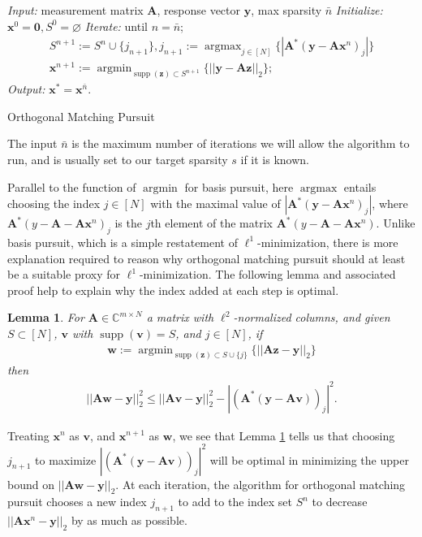 \documentclass[12pt,a4paper]{amsart}
\numberwithin{equation}{section}
\theoremstyle{plain}
\newtheorem{Lemma}[Th]{Lemma}
\theoremstyle{definition}
\newcommand{\BC}{\mathbb C}
\newcommand{\bdy}{\mathbf{y}}
\newcommand{\bdx}{\mathbf{x}}
\newcommand{\bdz}{\mathbf{z}}
\newcommand{\bdv}{\mathbf{v}}
\newcommand{\bdw}{\mathbf{w}}
\newcommand{\bdA}{\mathbf{A}}
\DeclareMathOperator{\argmin}{argmin}
\DeclareMathOperator{\argmax}{argmax}
\DeclareMathOperator{\supp}{supp}
\begin{document}
\begin{algorithm}
 \textit{Input:} measurement matrix $\bdA$, response vector $\bdy$, max sparsity $\bar n$\;
 \textit{Initialize:} $\bdx^0=\mathbf{0},S^0=\varnothing$\;
 \textit{Iterate:} until $n=\bar n$;
 \begin{align*}
     S^{n+1}:=S^n\cup\{j_{n+1}\}, j_{n+1}:=\argmax_{j\in[N]}\{|\bdA^*(\bdy-\bdA\bdx^n)_j|\}\\
     \bdx^{n+1}:=\argmin_{\supp(\bdz)\subset S^{n+1}}\{||\bdy-\bdA\bdz||_2\};
 \end{align*}
\textit{Output:} $\bdx^*=\bdx^{\bar n}$.
 \caption{Orthogonal Matching Pursuit}
\end{algorithm}

The input $\bar n$ is the maximum number of iterations we will allow the algorithm to run, and is usually set to our target sparsity $s$ if it is known.

Parallel to the function of $\argmin$ for basis pursuit, here $\argmax$ entails choosing the index $j\in[N]$ with the maximal value of $|\bdA^*(\bdy-\bdA\bdx^n)_j|$, where $\bdA^*(y-\bdA-\bdA\bdx^n)_j$ is the $j$th element of the matrix $\bdA^*(y-\bdA-\bdA\bdx^n)$. Unlike basis pursuit, which is a simple restatement of $\ell^1$-minimization, there is more explanation required to reason why orthogonal matching pursuit should at least be a suitable proxy for $\ell^1$-minimization. The following lemma and associated proof help to explain why the index added at each step is optimal.

\begin{Lemma}\label{omp-lem} For $\bdA\in\BC^{m\times N}$ a matrix with $\ell^2$-normalized columns, and given $S\subset[N]$, $\bdv$ with $\supp(\bdv)=S$, and $j\in [N]$, if
\begin{align}\label{omp-min}
    \bdw := \argmin_{\supp(\bdz)\subset S\cup\{j\}}\{||\bdA\bdz-\bdy||_2\}
\end{align}
then
\begin{align}
    ||\bdA\bdw-\bdy||^2_2\leq||\bdA\bdv-\bdy||^2_2-|(\bdA^*(\bdy-\bdA\bdv))_j|^2.
\end{align}
\end{Lemma}

Treating $\bdx^n$ as $\bdv$, and $\bdx^{n+1}$ as $\bdw$, we see that Lemma \ref{omp-lem} tells us that choosing $j_{n+1}$ to maximize $|(\bdA^*(\bdy-\bdA\bdv))_j|^2$ will be optimal in minimizing the upper bound on $||\bdA\bdw-\bdy||_2$. At each iteration, the algorithm for orthogonal matching pursuit chooses a new index $j_{n+1}$ to add to the index set $S^n$ to decrease $||\bdA\bdx^n-\bdy||_2$ by as much as possible.
\end{document}
